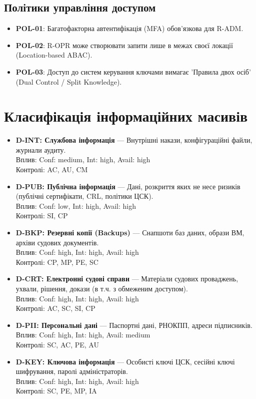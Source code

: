 \documentclass{article}
\begin{document}
\subsection{Політики управління доступом}
\begin{itemize}
\item \textbf{POL-01}: Багатофакторна автентифікація (MFA) обов'язкова для R-ADM.
\item \textbf{POL-02}: R-OPR може створювати запити лише в межах своєї локації (Location-based ABAC).
\item \textbf{POL-03}: Доступ до систем керування ключами вимагає 'Правила двох осіб' (Dual Control / Split Knowledge).
\end{itemize}


\newpage
\section{Класифікація інформаційних масивів}
\begin{itemize}
\item \textbf{D-INT: Службова інформація} — Внутрішні накази, конфігураційні файли, журнали аудиту.
\\ Вплив: Conf: medium, Int: high, Avail: high
\\ Контролі: AC, AU, CM
\item \textbf{D-PUB: Публічна інформація} — Дані, розкриття яких не несе ризиків (публічні сертифікати, CRL, політики ЦСК).
\\ Вплив: Conf: low, Int: high, Avail: high
\\ Контролі: SI, CP
\item \textbf{D-BKP: Резервні копії (Backups)} — Снапшоти баз даних, образи ВМ, архіви судових документів.
\\ Вплив: Conf: high, Int: high, Avail: high
\\ Контролі: CP, MP, PE, SC
\item \textbf{D-CRT: Електронні судові справи} — Матеріали судових проваджень, ухвали, рішення, докази (в т.ч. з обмеженим доступом).
\\ Вплив: Conf: high, Int: high, Avail: high
\\ Контролі: AC, SC, SI, CP
\item \textbf{D-PII: Персональні дані} — Паспортні дані, РНОКПП, адреси підписників.
\\ Вплив: Conf: high, Int: high, Avail: medium
\\ Контролі: SC, AC, PE, AU
\item \textbf{D-KEY: Ключова інформація} — Особисті ключі ЦСК, сесійні ключі шифрування, паролі адміністраторів.
\\ Вплив: Conf: high, Int: high, Avail: high
\\ Контролі: SC, PE, MP, IA
\end{itemize}
\end{document}
